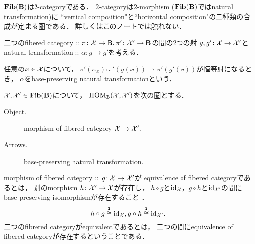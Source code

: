\begin{Remark}
    $\Fib{B}$は$2$-categoryである．
    $2$-categoryは$2$-morphism ($\Fib{B}$ではnatural transformation)に
    ``vertical composition"と``horizontal composition"の二種類の合成が定まる圏である．
    詳しくはこのノートでは触れない．
\end{Remark}

\begin{Def}
\begin{myenum}
\item
    二つのfibered category :: 
    $\pi \colon \stX \to \cat{B}, \pi' \colon \stX' \to \cat{B}$の間の$2$つの射
    $g,g' \colon \stX \to \stX'$と
    natural transformation :: $\alpha \colon g \to g'$を考える．
    \begin{center}
    \end{center}
    任意の$x \in \stX$について，
    $\pi'(\alpha_x) \colon \pi'(g(x)) \to \pi'(g'(x))$が恒等射になるとき，
    $\alpha$をbase-preserving natural transformationという．
    
\item
    $\stX, \stX' \in \Fib{B}$について，
    $\HOM_{\cat{B}}(\stX, \stX')$を次の圏とする．
    \begin{description}
        \item[Object.] morphism of fibered category $\stX \to \stX'$.
        \item[Arrows.] base-preserving natural transformation.
    \end{description}

\item
    morphism of fibered category :: $g \colon \stX \to \stX'$が
    equivalence of fibered categoryであるとは，
    別のmorphism $h \colon \stX' \to \stX$が存在し，
    $h \circ g$と$\id[\stX]$，$g \circ h$と$\id[\stX']$の間に
    base-preserving isomorphismが存在すること
    ．
    \[ h \circ g \kiso[2] \id[\stX], g \circ h \kiso[2] \id[\stX']. \]
    二つのfibrered categoryがequivalentであるとは，
    二つの間にequivalence of fibered categoryが存在するということである．
\end{myenum}
\end{Def}

